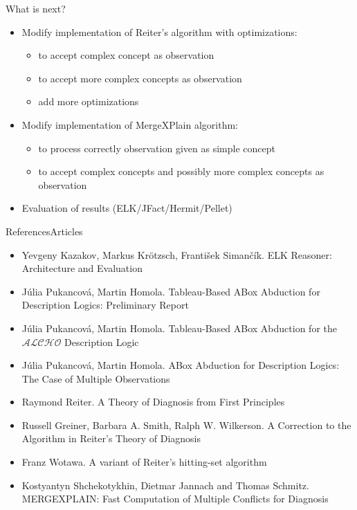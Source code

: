 \documentclass{beamer}
\begin{document}
\begin{frame}{What is next?}
	\begin{itemize}		
		\item Modify implementation of Reiter's algorithm with optimizations:
		\begin{itemize}
			\item to accept complex concept as observation
			\item to accept more complex concepts as observation
			\item add more optimizations
		\end{itemize}
		
		\item Modify implementation of MergeXPlain algorithm:
		\begin{itemize}
			\item to process correctly observation given as simple concept
			\item to accept complex concepts and possibly more complex concepts as observation
		\end{itemize}		
		\item {
			Evaluation of results (ELK/JFact/Hermit/Pellet)
		}		
	\end{itemize}
\end{frame}


\begin{frame}{References}{Articles}
	\begin{itemize}
	\item {
		Yevgeny Kazakov, Markus Krötzsch, František Simančík. ELK Reasoner: Architecture and Evaluation
	}
	\item {
		Júlia Pukancová, Martin Homola. Tableau-Based ABox Abduction for Description Logics: Preliminary Report
	}
	\item {
		Júlia Pukancová, Martin Homola. Tableau-Based ABox Abduction for the 		$\mathcal{ALCHO}$ Description Logic
	}
	\item {
		Júlia Pukancová, Martin Homola. ABox Abduction for Description Logics: The Case of Multiple Observations
	}
	\item {
		Raymond Reiter. A Theory of Diagnosis from First Principles
	}
	\item {
		Russell Greiner, Barbara A. Smith, Ralph W. Wilkerson. A Correction to the Algorithm in Reiter's Theory of Diagnosis
	}
	\item {
		Franz Wotawa. A variant of Reiter’s hitting-set algorithm
	}
	\item {
		Kostyantyn Shchekotykhin, Dietmar Jannach and Thomas Schmitz. MERGEXPLAIN: Fast Computation of Multiple Conflicts for Diagnosis
	}
	\end{itemize}
\end{frame}
\end{document}
